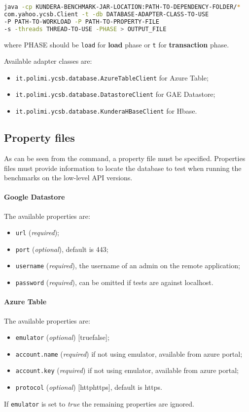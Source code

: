 \begin{lstlisting}[language=bash, caption=Run low-level API benchmarks, numbers=none]
java -cp KUNDERA-BENCHMARK-JAR-LOCATION:PATH-TO-DEPENDENCY-FOLDER/*
com.yahoo.ycsb.Client -t -db DATABASE-ADAPTER-CLASS-TO-USE
-P PATH-TO-WORKLOAD -P PATH-TO-PROPERTY-FILE 
-s -threads THREAD-TO-USE -PHASE > OUTPUT_FILE
\end{lstlisting}

\noindent where PHASE should be \texttt{load} for \textbf{load} phase or \texttt{t} for \textbf{transaction} phase.

\newparagraph  Available adapter classes are:
\begin{itemize}
\item \texttt{it.polimi.ycsb.database.AzureTableClient} for Azure Table;
\item \texttt{it.polimi.ycsb.database.DatastoreClient} for GAE Datastore;
\item \texttt{it.polimi.ycsb.database.KunderaHBaseClient} for Hbase.
\end{itemize}

\subsection{Property files}
As can be seen from the command, a property file must be specified. Properties files must provide information to locate the database to test when running the benchmarks on the low-level API versions.

\paragraph{Google Datastore} The available properties are:
\begin{itemize}
\item \texttt{url} (\textit{required});
\item \texttt{port} (\textit{optional}), default is 443;
\item \texttt{username} (\textit{required}), the username of an admin on the remote application;
\item \texttt{password} (\textit{required}), can be omitted if tests are against localhost.
\end{itemize}

\paragraph{Azure Table} The available properties are:
\begin{itemize}
\item \texttt{emulator} (\textit{optional}) [true\textbar false];
\item \texttt{account.name} (\textit{required}) if not using emulator, available from azure portal;
\item \texttt{account.key} (\textit{required}) if not using emulator, available from azure portal;
\item \texttt{protocol} (\textit{optional}) [http\textbar https], default is https.
\end{itemize}
\noindent If \texttt{emulator} is set to \textit{true} the remaining properties are ignored.

